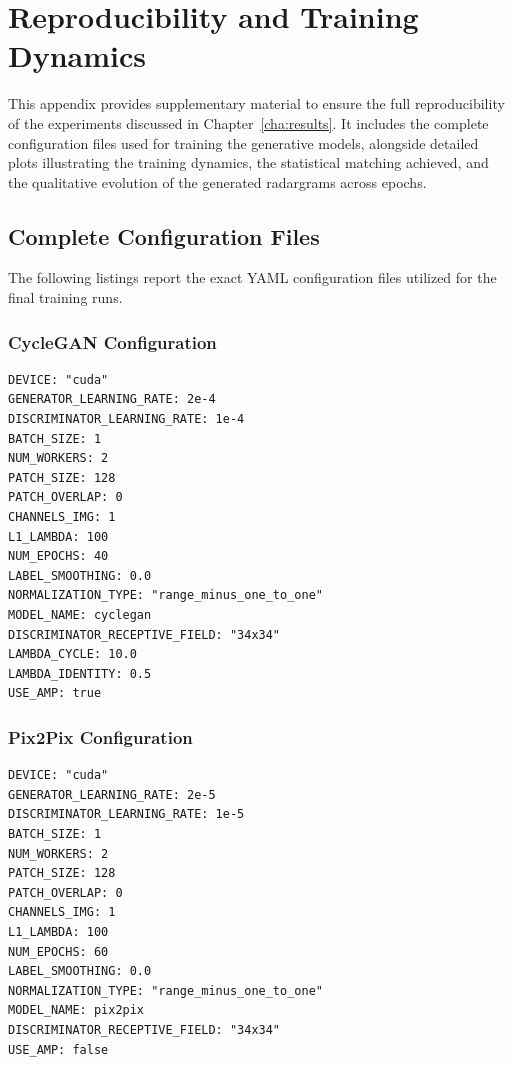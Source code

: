 \chapter{Reproducibility and Training Dynamics}
\label{app:reproducibility}

This appendix provides supplementary material to ensure the full reproducibility of the experiments discussed in Chapter~\ref{cha:results}.
It includes the complete configuration files used for training the generative models, alongside detailed plots illustrating the training dynamics, the statistical matching achieved, and the qualitative evolution of the generated radargrams across epochs.

\section{Complete Configuration Files}
The following listings report the exact YAML configuration files utilized for the final training runs. 

\subsection{CycleGAN Configuration}
\begin{lstlisting}[basicstyle=\ttfamily\footnotesize, frame=single, breaklines=true]
DEVICE: "cuda"
GENERATOR_LEARNING_RATE: 2e-4
DISCRIMINATOR_LEARNING_RATE: 1e-4
BATCH_SIZE: 1
NUM_WORKERS: 2
PATCH_SIZE: 128
PATCH_OVERLAP: 0
CHANNELS_IMG: 1
L1_LAMBDA: 100
NUM_EPOCHS: 40
LABEL_SMOOTHING: 0.0
NORMALIZATION_TYPE: "range_minus_one_to_one"
MODEL_NAME: cyclegan
DISCRIMINATOR_RECEPTIVE_FIELD: "34x34"
LAMBDA_CYCLE: 10.0
LAMBDA_IDENTITY: 0.5
USE_AMP: true
\end{lstlisting}

\subsection{Pix2Pix Configuration}
\begin{lstlisting}[basicstyle=\ttfamily\footnotesize, frame=single, breaklines=true]
DEVICE: "cuda"
GENERATOR_LEARNING_RATE: 2e-5
DISCRIMINATOR_LEARNING_RATE: 1e-5
BATCH_SIZE: 1
NUM_WORKERS: 2
PATCH_SIZE: 128
PATCH_OVERLAP: 0
CHANNELS_IMG: 1
L1_LAMBDA: 100
NUM_EPOCHS: 60
LABEL_SMOOTHING: 0.0
NORMALIZATION_TYPE: "range_minus_one_to_one"
MODEL_NAME: pix2pix
DISCRIMINATOR_RECEPTIVE_FIELD: "34x34"
USE_AMP: false
\end{lstlisting}

\clearpage

